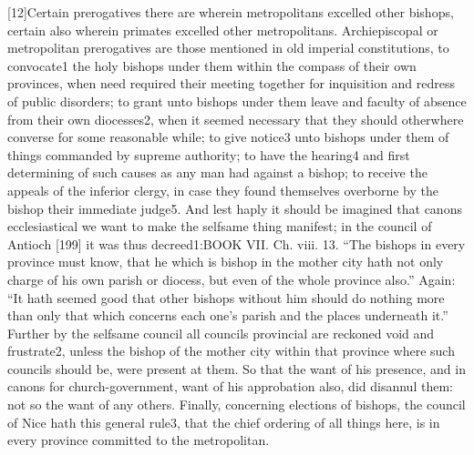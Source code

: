 [12]Certain prerogatives there are wherein metropolitans excelled other bishops, certain also wherein primates excelled other metropolitans. Archiepiscopal or metropolitan prerogatives are those mentioned in old imperial constitutions, to convocate1 the holy bishops under them within the compass of their own provinces, when need required their meeting together for inquisition and redress of public disorders; to grant unto bishops under them leave and faculty of absence from their own diocesses2, when it seemed necessary that they should otherwhere converse for some reasonable while; to give notice3 unto bishops under them of things commanded by supreme authority; to have the hearing4 and first determining of such causes as any man had against a bishop; to receive the appeals of the inferior clergy, in case they found themselves overborne by the bishop their immediate judge5. And lest haply it should be imagined that canons ecclesiastical we want to make the selfsame thing manifest; in the council of Antioch [199] it was thus decreed1:BOOK VII. Ch. viii. 13. “The bishops in every province must know, that he which is bishop in the mother city hath not only charge of his own parish or diocess, but even of the whole province also.” Again: “It hath seemed good that other bishops without him should do nothing more than only that which concerns each one’s parish and the places underneath it.” Further by the selfsame council all councils provincial are reckoned void and frustrate2, unless the bishop of the mother city within that province where such councils should be, were present at them. So that the want of his presence, and in canons for church-government, want of his approbation also, did disannul them: not so the want of any others. Finally, concerning elections of bishops, the council of Nice hath this general rule3, that the chief ordering of all things here, is in every province committed to the metropolitan.

